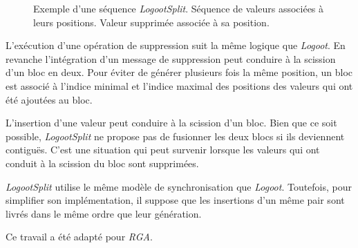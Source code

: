 \begin{figure}[tb]
\centering
\begin{subfigure}[b]{0.69\linewidth}
    \centering
    \caption{}
    \label{fig:logootsplit-1}
\end{subfigure}
\begin{subfigure}[b]{0.29\linewidth}
    \centering
    \caption{}
    \label{fig:logootsplit-2}
\end{subfigure}
\caption[Exemple d'une séquence \emph{LogootSplit}]{Exemple d'une séquence \emph{LogootSplit}.
 Séquence de valeurs associées à leurs positions.
 Valeur supprimée associée à sa position.}
\label{fig:logootsplit}
\end{figure}

L'exécution d'une opération de suppression suit la même logique que \emph{Logoot}.
En revanche l'intégration d'un message de suppression peut conduire à la scission d'un bloc en deux.
Pour éviter de générer plusieurs fois la même position, un bloc est associé à l'indice minimal et l'indice maximal des positions des valeurs qui ont été ajoutées au bloc.

L'insertion d'une valeur peut conduire à la scission d'un bloc.
Bien que ce soit possible, \emph{LogootSplit} ne propose pas de fusionner les deux blocs si ils deviennent contiguës.
C'est une situation qui peut survenir lorsque les valeurs qui ont conduit à la scission du bloc sont supprimées.

\emph{LogootSplit} utilise le même modèle de synchronisation que \emph{Logoot}.
Toutefois, pour simplifier son implémentation, il suppose que les insertions d'un même pair sont livrés dans le même ordre que leur génération.

Ce travail a été adapté pour \emph{RGA}\autocite{briot_2016_rgasplit}.



